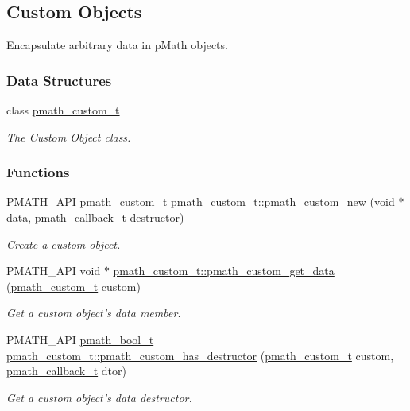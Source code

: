 \hypertarget{group__custom}{
\subsection{Custom Objects}
\label{group__custom}
}
Encapsulate arbitrary data in pMath objects.  


\subsubsection*{Data Structures}
\begin{CompactItemize}
\item 
class \hyperlink{classpmath__custom__t}{pmath\_\-custom\_\-t}
\begin{CompactList}\small\item\em The Custom Object class. \item\end{CompactList}\end{CompactItemize}
\subsubsection*{Functions}
\begin{CompactItemize}
\item 
PMATH\_\-API \hyperlink{classpmath__custom__t}{pmath\_\-custom\_\-t} \hyperlink{group__custom_g2ffdd4054c43b543bed1e5238ab7342c}{pmath\_\-custom\_\-t::pmath\_\-custom\_\-new} (void $\ast$data, \hyperlink{group__general__types_ge1a454657f18f3cc54508adeccccbcbc}{pmath\_\-callback\_\-t} destructor)
\begin{CompactList}\small\item\em Create a custom object. \item\end{CompactList}\item 
PMATH\_\-API void $\ast$ \hyperlink{group__custom_ge7902883fc5e8f88b60410950564fdcd}{pmath\_\-custom\_\-t::pmath\_\-custom\_\-get\_\-data} (\hyperlink{classpmath__custom__t}{pmath\_\-custom\_\-t} custom)
\begin{CompactList}\small\item\em Get a custom object's data member. \item\end{CompactList}\item 
PMATH\_\-API \hyperlink{group__general__types_gc92090cb0b56345d6c379ed2341d4ef4}{pmath\_\-bool\_\-t} \hyperlink{group__custom_g0847bc90fa81ddfdf0f3ff84d32947cf}{pmath\_\-custom\_\-t::pmath\_\-custom\_\-has\_\-destructor} (\hyperlink{classpmath__custom__t}{pmath\_\-custom\_\-t} custom, \hyperlink{group__general__types_ge1a454657f18f3cc54508adeccccbcbc}{pmath\_\-callback\_\-t} dtor)
\begin{CompactList}\small\item\em Get a custom object's data destructor. \item\end{CompactList}\end{CompactItemize}


